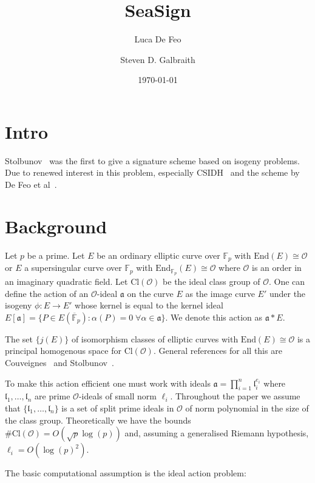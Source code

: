 \documentclass{llncs}
\title{SeaSign}
\author{Luca De Feo \and Steven D. Galbraith}
\institute{Mathematics Department, University of Auckland, NZ.
\email{s.galbraith@auckland.ac.nz}}
\date{\today}
\newcommand{\F}{\mathbb{F}}
\newcommand{\Fpbar}{\overline{\mathbb{F}}_p}
\newcommand{\OO}{\mathcal{O}}
\newcommand{\End}{\text{End}}
\newcommand{\Cl}{\text{Cl}}
\renewcommand{\a}{\mathfrak{a}}
\renewcommand{\l}{\mathfrak{l}}
\begin{document}
\pagestyle{plain}

\maketitle


\begin{abstract}

\end{abstract}



\section{Intro}

Stolbunov~\cite{Sto12} was the first to give a signature scheme based on isogeny problems.
Due to renewed interest in this problem, especially CSIDH~\cite{CLMPR18} and the scheme by De Feo et al~\cite{DFKS18}.


\section{Background}

Let $p$ be a prime.
Let $E$ be an ordinary elliptic curve over $\F_p$ with $\End(E) \cong \OO$ or $E$ a supersingular curve over $\F_p$ with $\End_{\F_p}(E) \cong \OO$ where $\OO$ is an order in an imaginary quadratic field.
Let $\Cl(\OO )$ be the ideal class group of $\OO$.
One can define the action of an $\OO$-ideal $\a$ on the curve $E$ as the image curve $E'$ under the isogeny $\phi : E \to E'$ whose kernel is equal to the kernel ideal $E[ \a ] = \{ P \in E( \Fpbar ) : \alpha(P) = 0 \; \forall \alpha \in \a \}$.
We denote this action as $\a * E$.

The set $\{ j(E) \}$ of isomorphism classes of elliptic curves with $\End(E) \cong \OO$ is a principal homogenous space for $\Cl(\OO )$.
General references for all this are Couveignes~\cite{Couv06}
and Stolbunov~\cite{Sto12}.

To make this action efficient one must work with ideals $\a = \prod_{i=1}^n \l_i^{e_i}$ where $\l_1, \dots, \l_n$ are prime $\OO$-ideals of small norm $\ell_i$.
Throughout the paper we assume that $\{ \l_1, \dots, \l_n \}$ is a set of split prime ideals in $\OO$ of norm polynomial in the size of the class group.
Theoretically we have the bounds $\#\Cl(\OO) = O( \sqrt{p} \log(p) )$ and, assuming a generalised Riemann hypothesis, $\ell_i = O( \log(p)^2 )$.

The basic computational assumption is the ideal action problem:
\end{document}
